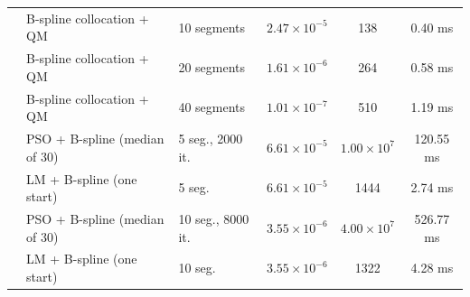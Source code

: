 \begin{tabular}{lllccc}
 & B-spline collocation + QM & 10 segments & $2.47\times10^{-5}$ & 138 & 0.40 ms\\
 & B-spline collocation + QM & 20 segments & $1.61\times10^{-6}$ & 264 & 0.58 ms\\
 & B-spline collocation + QM & 40 segments & $1.01\times10^{-7}$ & 510 & 1.19 ms\\
 & PSO + B-spline (median of 30) & 5 seg., 2000 it. & $6.61\times10^{-5}$ & $1.00\times10^{7}$ & 120.55 ms\\
 & LM + B-spline (one start) & 5 seg. & $6.61\times10^{-5}$ & 1444 & 2.74 ms\\
 & PSO + B-spline (median of 30) & 10 seg., 8000 it. & $3.55\times10^{-6}$ & $4.00\times10^{7}$ & 526.77 ms\\
 & LM + B-spline (one start) & 10 seg. & $3.55\times10^{-6}$ & 1322 & 4.28 ms\\
\bottomrule
\end{tabular}